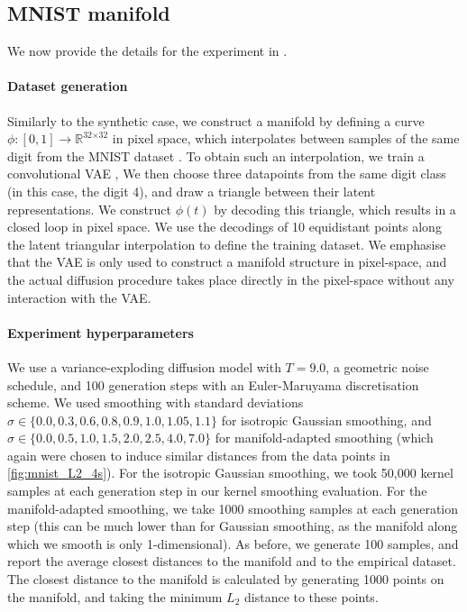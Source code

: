 \documentclass[10pt]{article}
\theoremstyle{plain}
\theoremstyle{definition}
\theoremstyle{remark}
\newcommand{\R}{\mathbb{R}}
\begin{document}
\subsection{MNIST manifold}
\label{app:MNIST_compare_smoothing}

We now provide the details for the experiment in .

\paragraph{Dataset generation}
Similarly to the synthetic case, we construct a manifold by defining a curve ${\phi : [0,1] \to \R^{\text{32} \times \text{32}}}$ in pixel space, which interpolates between samples of the same digit from the MNIST dataset \citep{lecun2010mnist}. To obtain such an interpolation, we train a convolutional VAE \citep{kingma2022autoencodingvariationalbayes},
We then choose three datapoints from the same digit class (in this case, the digit 4), and draw a triangle between their latent representations. We construct $\phi(t)$ by decoding this triangle, which results in a closed loop in pixel space. We use the decodings of 10 equidistant points along the latent triangular interpolation to define the training dataset.
We emphasise that the VAE is only used to construct a manifold structure in pixel-space, and the actual diffusion procedure takes place directly in the pixel-space without any interaction with the VAE.

\paragraph{Experiment hyperparameters}
We use a variance-exploding diffusion model with $T=9.0$, a geometric noise schedule, and 100 generation steps with an Euler-Maruyama discretisation scheme. 
We used smoothing with standard deviations $\sigma \in \{0.0, 0.3, 0.6, 0.8, 0.9, 1.0, 1.05, 1.1 \}$ for isotropic Gaussian smoothing, and $\sigma \in \{0.0, 0.5, 1.0, 1.5, 2.0, 2.5, 4.0, 7.0\}$ for manifold-adapted smoothing (which again were chosen to induce similar distances from the data points in \cref{fig:mnist_L2_4s}).
For the isotropic Gaussian smoothing, we took 50,000 kernel samples at each generation step in our kernel smoothing evaluation. For the manifold-adapted smoothing, we take 1000 smoothing samples at each generation step (this can be much lower than for Gaussian smoothing, as the manifold along which we smooth is only 1-dimensional). As before, we generate 100 samples, and report the average closest distances to the manifold and to the empirical dataset. The closest distance to the manifold is calculated by generating 1000 points on the manifold, and taking the minimum $L_2$ distance to these points.
\end{document}
